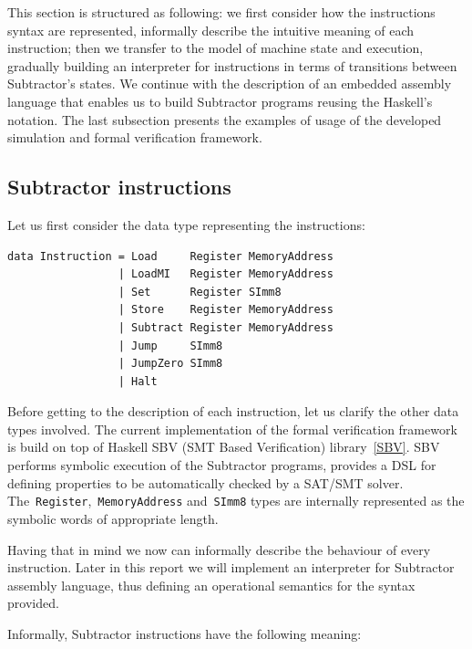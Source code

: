 This section is structured as following: we first consider how the instructions syntax are represented, informally describe the intuitive meaning of each instruction; then we transfer to the model of machine state and execution, gradually building an interpreter for instructions in terms of transitions between Subtractor's states. We continue with the description of an embedded assembly language that enables us to build Subtractor programs reusing the Haskell's notation. The last subsection presents the examples of usage of the developed simulation and formal verification framework.

\subsection{Subtractor instructions}
\label{Instructions}

Let us first consider the data type representing the instructions:

\begin{verbatim}
data Instruction = Load     Register MemoryAddress
                 | LoadMI   Register MemoryAddress
                 | Set      Register SImm8
                 | Store    Register MemoryAddress
                 | Subtract Register MemoryAddress
                 | Jump     SImm8
                 | JumpZero SImm8
                 | Halt
\end{verbatim}

Before getting to the description of each instruction, let us clarify the other data types involved. The current implementation of the formal verification framework is build on top of Haskell SBV (SMT Based Verification) library~\ref{SBV}. SBV performs symbolic execution of the Subtractor programs, provides a DSL for defining properties to be automatically checked by a SAT/SMT solver. The~\texttt{Register},~\texttt{MemoryAddress} and~\texttt{SImm8} types are internally represented as the symbolic words of appropriate length.

Having that in mind we now can informally describe the behaviour of every instruction. Later in this report we will implement an interpreter for Subtractor assembly language, thus defining an operational semantics for the syntax provided.

Informally, Subtractor instructions have the following meaning:

